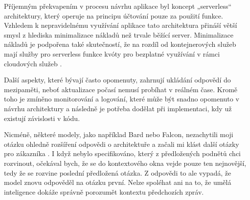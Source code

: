 \documentclass[FM,DP]{tulthesis}
\begin{document}
		Příjemným překvapením v procesu návrhu aplikace byl koncept „serverless“ architektury, který operuje na principu účtování pouze za použití funkce. Vzhledem k nepravidelnému využívání aplikace tato architektura přináší větší smysl z hlediska minimalizace nákladů než trvale běžící server. Minimalizace nákladů je podpořena také skutečností, že na rozdíl od kontejnerových služeb mají služby pro serverless funkce kvóty pro bezplatné využívání v rámci cloudových služeb \cite{webapp_basics} \cite{bard_analyza} \cite{chatgpt_analyza} \cite{codellama_analyza} \cite{gitCopilot_analyza} \cite{claude_analyza} \cite{bingCopilot_analyza}. 
		
		Další aspekty, které bývají často opomenuty, zahrnují ukládání odpovědí do mezipaměti, neboť aktualizace počasí nemusí probíhat v reálném čase. Kromě toho je zmíněno monitorování a logování, které může být snadno opomenuto v návrhu architektury a následně je potřeba dodělat při implementaci, kdy už existují závislosti v kódu.
		
		Nicméně, některé modely, jako například Bard nebo Falcon, nezachytili moji otázku ohledně rozšíření odpovědi o architektuře a začali mi klást další otázky pro zákazníka \cite{bard_analyza} \cite{falcon_analyza}. I když nebylo specifikováno, který z předložených podnětů chci rozvinout, očekával bych, že se do kontextového okna vejde pouze ten nejnovější, tedy že se rozvine poslední předložená otázka. Z odpovědi to ale vypadá, že model znovu odpověděl na otázku první. Nelze spoléhat ani na to, že umělá inteligence dokáže správně porozumět kontextu předchozích zpráv.
		
\end{document}

